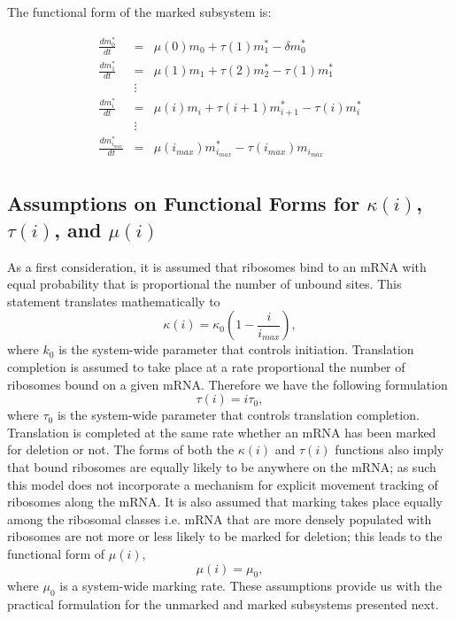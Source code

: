 \documentclass[review]{elsarticle}
\begin{document}
The functional form of the marked subsystem is:

\begin{eqnarray*}
\frac{dm_{0}^{*}}{dt} & = & \mu(0)m_{0}+\tau(1)m_{1}^{*}-\delta m_{0}^{*} \\
\frac{dm_{1}^{*}}{dt} & = & \mu(1)m_{1}+\tau(2)m_{2}^{*}-\tau(1)m_{1}^{*} \\
& \vdots & \\
\frac{dm_{i}^{*}}{dt} & = & \mu(i)m_{i}+\tau(i+1)m_{i+1}^{*}-\tau(i)m_{i}^{*} \\
& \vdots & \\
\frac{dm_{i_{max}}^{*}}{dt} & = & \mu(i_{max})m_{i_{max}}^{*}-\tau(i_{max})m_{i_{max}} \\
\end{eqnarray*}

\subsection{Assumptions on Functional Forms for $\kappa(i)$, $\tau(i)$, and $\mu(i)$}\label{sec:assumed_forms}

As a first consideration, it is assumed that ribosomes bind to an mRNA with equal probability that is proportional the number of unbound sites.  This statement translates mathematically to $$\kappa(i)=\kappa_0\left(1-\frac{i}{i_{max}}\right),$$ where $k_0$ is the system-wide parameter that controls initiation.  Translation completion is assumed to take place at a rate proportional the number of ribosomes bound on a given mRNA.  Therefore we have the following formulation $$\tau(i)=i\tau_0,$$ where $\tau_0$ is the system-wide parameter that controls translation completion.  Translation is completed at the same rate whether an mRNA has been marked for deletion or not.  The forms of both the $\kappa(i)$ and $\tau(i)$ functions also imply that bound ribosomes are equally likely to be anywhere on the mRNA; as such this model does not incorporate a mechanism for explicit movement tracking of ribosomes along the mRNA.  It is also assumed that marking takes place equally among the ribosomal classes i.e. mRNA that are more densely populated with ribosomes are not more or less likely to be marked for deletion; this leads to the functional form of $\mu(i)$, $$\mu(i)=\mu_0,$$ where $\mu_0$ is a system-wide marking rate.  These assumptions provide us with the practical formulation for the unmarked and marked subsystems presented next.
\end{document}
